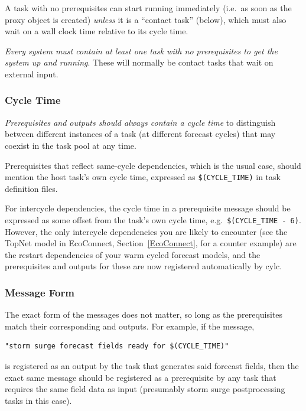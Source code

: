 \documentclass[11pt,a4paper]{article}
\begin{document}
A task with no prerequisites can start running immediately (i.e.\ as soon
as the proxy object is created) {\em unless} it is a ``contact task''
(below), which must also wait on a wall clock time relative to its cycle time.

{\em Every system must contain at least one task with no prerequisites
to get the system up and running}. These will normally be contact tasks that wait
on external input.


\lstset{language=cylctaskdef} 

\subsubsection{Cycle Time}

{\em Prerequisites and outputs should always contain a cycle time} to
distinguish between different instances of a task (at different 
forecast cycles) that may coexist in the task pool at any time. 

Prerequisites that reflect same-cycle dependencies, which is the usual
case, should mention the host task's own cycle time, expressed as
\lstinline=$(CYCLE_TIME)= in task definition files.

For intercycle dependencies, the cycle time in a prerequisite message
should be expressed as some offset from the task's own cycle time, e.g.\
\lstinline=$(CYCLE_TIME - 6)=. However, the only intercycle dependencies
you are likely to encounter (see the TopNet model in EcoConnect,
Section~\ref{EcoConnect}, for a counter example) are the restart
dependencies of your warm cycled forecast models, and the prerequisites
and outputs for these are now registered automatically by cylc.

\subsubsection{Message Form}

The exact form of the messages does not matter, so long as the
prerequisites match their corresponding and outputs. For example, if
the message, 
\begin{lstlisting}
"storm surge forecast fields ready for $(CYCLE_TIME)"
\end{lstlisting} 
is registered as an output by the task that generates said forecast
fields, then the exact same message should be registered as a
prerequisite by any task that requires the same field data as input
(presumably storm surge postprocessing tasks in this case). 
\end{document}
